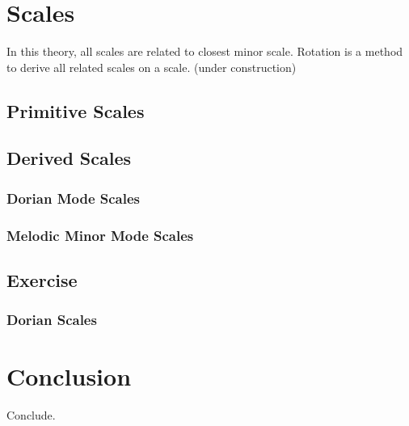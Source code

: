 \documentclass[a4paper]{article}
\begin{document}



\newcommand{\scalesDescription} { hello }

\section{Scales}

In this theory, all scales are related to closest minor scale. Rotation is a method to derive all related scales on a scale. (under construction)\\

\subsection { Primitive Scales }



\subsection { Derived Scales }

\subsubsection { Dorian Mode Scales }

\subsubsection { Melodic Minor Mode Scales }



\subsection { Exercise }
\subsubsection { Dorian Scales }


\section{Conclusion}
Conclude. %
\end{document}
